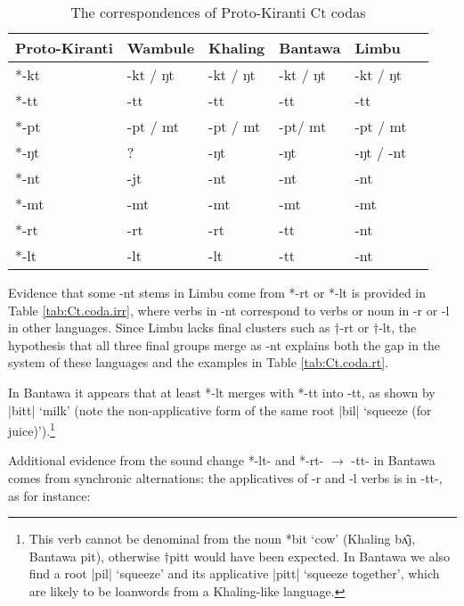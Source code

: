 \documentclass[oneside,a4paper,11pt]{article}
\newcommand{\ipa}[1]{{\phon\mbox{#1}}} %
\newcommand{\dhatu}[2]{|\ipa{#1}| `#2'}
\begin{document}
\begin{table}[H]
\caption{The correspondences of Proto-Kiranti Ct codas} \centering \label{tab:Ct.coda}
\begin{tabular}{llllll}
\toprule
Proto-Kiranti & Wambule & Khaling & Bantawa & Limbu \\
\midrule
\ipa{*-kt} & \ipa{-kt} / \ipa{ŋt} & \ipa{-kt} / \ipa{ŋt} & \ipa{-kt} / \ipa{ŋt} & \ipa{-kt} / \ipa{ŋt}  \\
\ipa{*-tt} & \ipa{-tt} & \ipa{-tt}  & \ipa{-tt} & \ipa{-tt} \\
\ipa{*-pt} & \ipa{-pt} / \ipa{mt} & \ipa{-pt} / \ipa{mt}& \ipa{-pt}/ \ipa{mt} & \ipa{-pt} / \ipa{mt} \\
\midrule
\ipa{*-ŋt} & ?& \ipa{-ŋt} & \ipa{-ŋt} & \ipa{-ŋt}  / \ipa{-nt} \\
\ipa{*-nt} & \ipa{-jt}  & \ipa{-nt} & \ipa{-nt} & \ipa{-nt}  \\
\ipa{*-mt} & \ipa{-mt} & \ipa{-mt} & \ipa{-mt} & \ipa{-mt}  \\
\midrule
\ipa{*-rt} &  \ipa{-rt}  & \ipa{-rt} & \ipa{-tt}  & \ipa{-nt}  \\
\ipa{*-lt} & \ipa{-lt} & \ipa{-lt} & \ipa{-tt} & \ipa{-nt}  \\
\bottomrule
\end{tabular}
\end{table}

Evidence that some \ipa{-nt} stems in Limbu come from \ipa{*-rt} or \ipa{*-lt} is provided in Table \ref{tab:Ct.coda.irr}, where verbs in \ipa{-nt} correspond to verbs or noun in \ipa{-r} or \ipa{-l} in other languages. Since  Limbu  lacks final clusters such as $\dagger$\ipa{-rt} or $\dagger$\ipa{-lt}, the hypothesis that all three final groups merge as \ipa{-nt} explains both the gap in the system of these languages and the examples in Table \ref{tab:Ct.coda.rt}. 

In Bantawa it appears that at least *\ipa{-lt} merges with *\ipa{-tt} into \ipa{-tt}, as shown by \dhatu{bitt}{milk} (note the non-applicative form of the same root \dhatu{bil}{squeeze (for juice)}).\footnote{This verb cannot be denominal from the noun *\ipa{bit} `cow'  (Khaling \ipa{bʌ̂j}, Bantawa \ipa{pit}), otherwise $\dagger$\ipa{pitt} would have been expected. In Bantawa we also find a root  \dhatu{pil}{squeeze} and its applicative \dhatu{pitt}{squeeze together}, which are likely to be loanwords from a Khaling-like language.}

Additional evidence from the sound change \ipa{*-lt-} and  \ipa{*-rt-} $\rightarrow$ \ipa{-tt-} in Bantawa comes from synchronic alternations: the applicatives of \ipa{-r} and \ipa{-l} verbs is in \ipa{-tt-}, as for instance:
\end{document}
